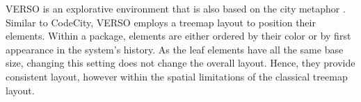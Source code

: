 VERSO is an explorative environment that is also based on the city metaphor \cite{Lang05a}. Similar to CodeCity, VERSO employs a treemap layout to position their elements. Within a package, elements are either ordered by their color or by first appearance in the system's history. As the leaf elements have all the same base size, changing this setting does not change the overall layout. Hence, they provide consistent layout, however within the spatial limitations of the classical treemap layout. 

